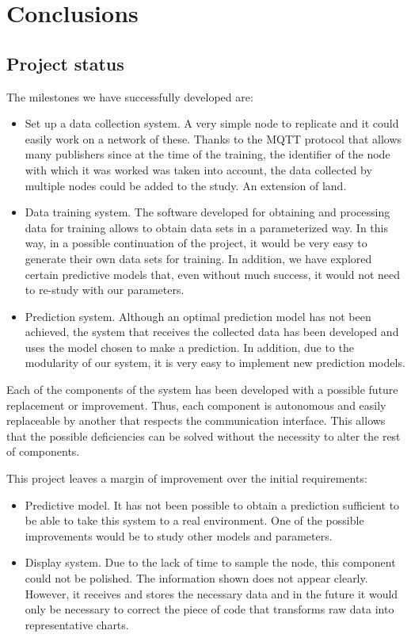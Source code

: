 \cleardoublepage

\chapter{Conclusions}
\label{makereference10}

\section{Project status}

The milestones we have successfully developed are:
\begin{itemize}
\item Set up a data collection system. A very simple node to replicate and it could easily work on a network of these. Thanks to the MQTT protocol that allows many publishers since at the time of the training, the identifier of the node with which it was worked was taken into account, the data collected by multiple nodes could be added to the study. An extension of land.

\item Data training system. The software developed for obtaining and processing data for training allows to obtain data sets in a parameterized way. In this way, in a possible continuation of the project, it would be very easy to generate their own data sets for training. In addition, we have explored certain predictive models that, even without much success, it would not need to re-study with our parameters.

\item Prediction system. Although an optimal prediction model has not been achieved, the system that receives the collected data has been developed and uses the model chosen to make a prediction. In addition, due to the modularity of our system, it is very easy to implement new prediction models.
\end{itemize}

Each of the components of the system has been developed with a possible future replacement or improvement. Thus, each component is autonomous and easily replaceable by another that respects the communication interface. This allows that the possible deficiencies can be solved without the necessity to alter the rest of components.

This project leaves a margin of improvement over the initial requirements:

\begin{itemize}
\item Predictive model. It has not been possible to obtain a prediction sufficient to be able to take this system to a real environment. One of the possible improvements would be to study other models and parameters.

\item Display system. Due to the lack of time to sample the node, this component could not be polished. The information shown does not appear clearly. However, it receives and stores the necessary data and in the future it would only be necessary to correct the piece of code that transforms raw data into representative charts.
\end{itemize}

